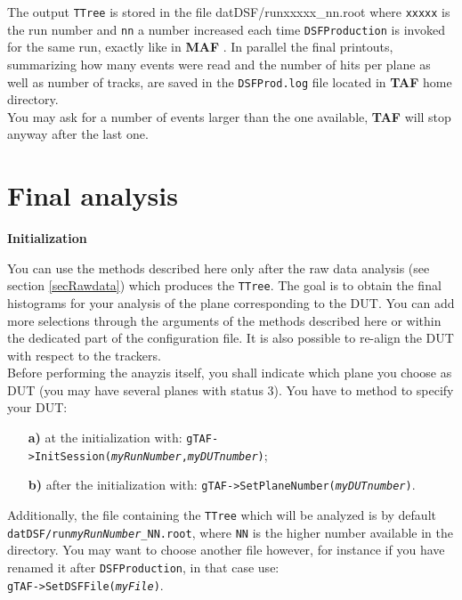 \documentclass[a4paper, 12pt, twoside]{article}
\newcommand{\TAF}{{\bf TAF }}
\newcommand{\MAF}{{\bf MAF }}
\begin{document}
\noindent
The output {\tt TTree} is stored in the file {datDSF/runxxxxx\_nn.root} where {\tt xxxxx} is the run number and {\tt nn} a number increased each time {\tt DSFProduction} is invoked for the same run, exactly like in \MAF. In parallel the final printouts, summarizing how many events were read and the number of hits per plane as well as number of tracks, are saved in the {\tt DSFProd.log} file located in \TAF home directory.\\
You may ask for a number of events larger than the one available, \TAF will stop anyway after the last one.\\


\vspace{2cm}

\section{Final analysis}
\label{secAnalysis}

\noindent
{\bf Initialization}

\noindent
You can use the methods described here only after the raw data analysis (see section \ref{secRawdata}) which produces the {\tt TTree}. The goal is to obtain the final histograms for your analysis of the plane corresponding to the DUT. You can add more selections through the arguments of the methods described here or within the dedicated part of the configuration file. It is also possible to re-align the DUT with respect to the trackers.\\
Before performing the anayzis itself, you shall indicate which plane you choose as DUT (you may have several planes with status 3). You have to method to specify your DUT:
\begin{itemize}
\item[{\bf a)}] at the initialization with: {\tt gTAF->InitSession({\it myRunNumber},{\it myDUTnumber})};
\item[{\bf b)}] after the initialization with: {\tt gTAF->SetPlaneNumber({\it myDUTnumber})}.
\end{itemize}
Additionally, the file containing the {\tt TTree} which will be analyzed is by default {\tt datDSF/run{\it{myRunNumber}}\_{NN}.root}, where {\tt NN} is the higher number available in the directory. You may want to choose another file however, for instance if you have renamed it after {\tt DSFProduction}, in that case use:\\
{\tt gTAF->SetDSFFile({\it myFile})}.\\
\end{document}
